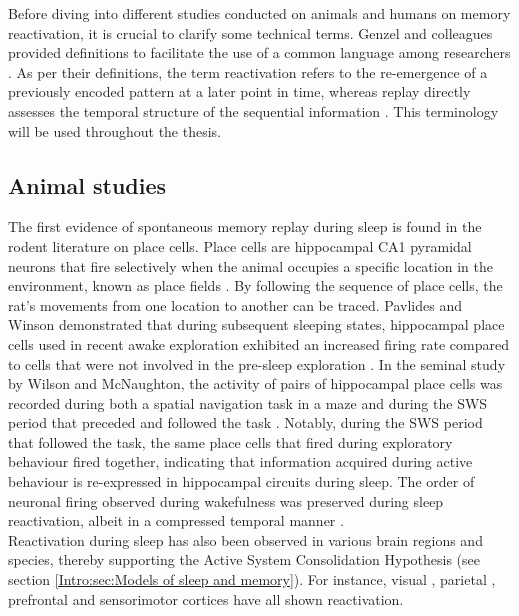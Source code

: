 Before diving into different studies conducted on animals and humans on memory reactivation, it is crucial to clarify some technical terms. Genzel and colleagues provided definitions to facilitate the use of a common language among researchers \parencite{genzel_consensus_2020}. As per their definitions, the term reactivation refers to the re-emergence of a previously encoded pattern at a later point in time, whereas replay directly assesses the temporal structure of the sequential information \parencite{genzel_consensus_2020}. This terminology will be used throughout the thesis. 

\subsection{Animal studies}
The first evidence of spontaneous memory replay during sleep is found in the rodent literature on place cells. Place cells are hippocampal CA1 pyramidal neurons that fire selectively when the animal occupies a specific location in the environment, known as place fields \parencite{girardeau_hippocampal_2011,okeefe_hippocampus_1971}. By following the sequence of place cells, the rat’s movements from one location to another can be traced. 
Pavlides and Winson demonstrated that during subsequent sleeping states, hippocampal place cells used in recent awake exploration exhibited an increased firing rate compared to cells that were not involved in the pre-sleep exploration \parencite{pavlides_influences_1989}. In the seminal study by Wilson and McNaughton, the activity of pairs of hippocampal place cells was recorded during both a spatial navigation task in a maze and during the SWS period that preceded and followed the task \parencite{wilson_reactivation_1994}. Notably, during the SWS period that followed the task, the same place cells that fired during exploratory behaviour fired together, indicating that information acquired during active behaviour is re-expressed in hippocampal circuits during sleep. The order of neuronal firing observed during wakefulness was preserved during sleep reactivation, albeit in a compressed temporal manner \parencite{wilson_reactivation_1994}. \\
Reactivation during sleep has also been observed in various brain regions and species, thereby supporting the Active System Consolidation Hypothesis (see section \ref{Intro:sec:Models of sleep and memory}). For instance, visual \parencite{ji_coordinated_2007}, parietal \parencite{qin_memory_1997}, prefrontal \parencite{benchenane_coherent_2010,euston_fast-forward_2007,johnson_stored-trace_2010,peyrache_replay_2009} and sensorimotor cortices \parencite{hoffman_coordinated_2002} have all shown reactivation. 
